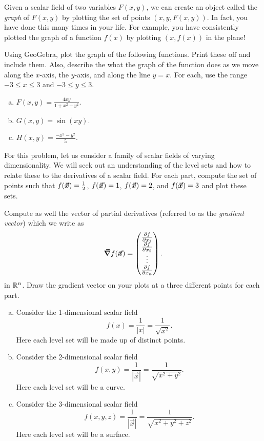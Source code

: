 \documentclass[12pt]{article} %
\begin{document}
\begin{problem}
Given a scalar field of two variables $F(x,y)$, we can create an object called the \emph{graph} of $F(x,y)$ by plotting the set of points $(x,y,F(x,y))$. In fact, you have done this many times in your life. For example, you have consistently plotted the graph of a function $f(x)$ by plotting $(x,f(x))$ in the plane!  

Using GeoGebra, plot the graph of the following functions. Print these off and include them.  Also, describe the what the graph of the function does as we move along the $x$-axis, the $y$-axis, and along the line $y=x$. For each, use the range $-3\leq x \leq 3$ and $-3\leq y \leq 3$.
\begin{enumerate}[(a)]
	\item $F(x,y) = \frac{4xy}{1+x^2+y^2}$.
	\item $G(x,y) = \sin(xy)$.
	\item $H(x,y) = \frac{-x^2-y^2}{5}$.
\end{enumerate}
\end{problem}

\begin{problem}
For this problem, let us consider a family of scalar fields of varying dimensionality.  We will seek out an understanding of the level sets and how to relate these to the derivatives of a scalar field. For each part, compute the set of points such that $f(\boldsymbol{\vec{x}})=\frac{1}{2}$, $f(\boldsymbol{\vec{x}})=1$, $f(\boldsymbol{\vec{x}})=2$, and $f(\boldsymbol{\vec{x}})=3$ and plot these sets. 

Compute as well the vector of partial derivatives (referred to as the \emph{gradient vector}) which we write as
\[
\boldsymbol{\vec{\nabla}} f(\boldsymbol{\vec{x}}) = \begin{pmatrix} \frac{\partial f}{\partial x_1} \\ \frac{\partial f}{\partial x_2} \\ \vdots \\ \frac{\partial f}{\partial x_n}\end{pmatrix}.
\]
in $\mathbb{R}^n$. Draw the gradient vector on your plots at a three different points for each part.
\begin{enumerate}[(a)]
	\item Consider the 1-dimensional scalar field 
	\[
	f(x) = \frac{1}{|x|}=\frac{1}{\sqrt{x^2}}.
	\]
	Here each level set will be made up of distinct points.
	\item Consider the 2-dimensional scalar field
	\[
	f(x,y) = \frac{1}{|\vec{x}|} = \frac{1}{\sqrt{x^2+y^2}}.
	\]
	Here each level set will be a curve.
	\item Consider the 3-dimensional scalar field
		\[
		f(x,y,z) = \frac{1}{|\vec{x}|} = \frac{1}{\sqrt{x^2+y^2+z^2}}.
		\]
		Here each level set will be a surface.
\end{enumerate}
\end{problem}
\end{document}
